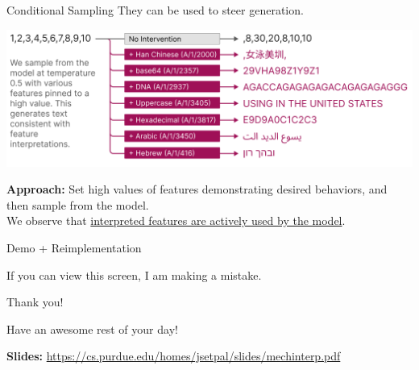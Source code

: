 \documentclass{beamer}
\begin{document}
\begin{frame}{Conditional Sampling}
	They can be used to steer generation.
	\begin{center}
		\includegraphics[width=.7\textwidth]{img/sampling.png}
	\end{center} \pause

	\textbf{Approach:} Set high values of features demonstrating desired behaviors, and then sample from the model. \pause \newline \\

	We observe that \underline{interpreted features are actively used by the model}.
\end{frame}

\begin{frame}{Demo + Reimplementation}
	\begin{center}
		If you can view this screen, I am making a mistake.
	\end{center}
\end{frame}

\begin{frame}{Thank you!}
	\begin{center}
		Have an awesome rest of your day!
	\end{center}
	\begin{center}
		\textbf{Slides:} {\small \url{https://cs.purdue.edu/homes/jsetpal/slides/mechinterp.pdf}}
	\end{center}
\end{frame}
\end{document}
